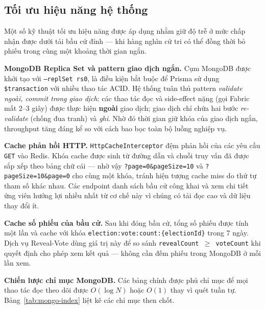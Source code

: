 \subsection{Tối ưu hiệu năng hệ thống}

Một số kỹ thuật tối ưu hiệu năng được áp dụng nhằm giữ độ trễ ở mức chấp nhận được dưới tải bầu cử đỉnh — khi hàng nghìn cử tri có thể đồng thời bỏ phiếu trong cùng một khoảng thời gian ngắn.

\textbf{MongoDB Replica Set và pattern giao dịch ngắn.} Cụm MongoDB được khởi tạo với \texttt{--replSet rs0}, là điều kiện bắt buộc để Prisma sử dụng \texttt{\$transaction} với nhiều thao tác ACID. Hệ thống tuân thủ pattern \textit{validate ngoài, commit trong giao dịch}: các thao tác đọc và side-effect nặng (gọi Fabric mất 2--3 giây) được thực hiện \textbf{ngoài} giao dịch; giao dịch chỉ chứa hai bước \textit{re-validate} (chống đua tranh) và \textit{ghi}. Nhờ đó thời gian giữ khóa của giao dịch ngắn, throughput tăng đáng kể so với cách bao bọc toàn bộ luồng nghiệp vụ.

\textbf{Cache phản hồi HTTP.} \texttt{HttpCacheInterceptor} đệm phản hồi của các yêu cầu \texttt{GET} vào Redis. Khóa cache được sinh từ đường dẫn và chuỗi truy vấn đã được sắp xếp theo bảng chữ cái — nhờ vậy \texttt{?page=0\&pageSize=10} và \texttt{?pageSize=10\&page=0} cho cùng một khóa, tránh hiện tượng cache miss do thứ tự tham số khác nhau. Các endpoint danh sách bầu cử công khai và xem chi tiết ứng viên hưởng lợi nhiều nhất từ cơ chế này vì chúng có tải đọc cao và dữ liệu thay đổi ít.

\textbf{Cache số phiếu của bầu cử.} Sau khi đóng bầu cử, tổng số phiếu được tính một lần và cache với khóa \texttt{election:vote:count:\{electionId\}} trong 7 ngày. Dịch vụ Reveal-Vote dùng giá trị này để so sánh \texttt{revealCount $\geq$ voteCount} khi quyết định cho phép xem kết quả — không cần đếm phiếu trong MongoDB ở mỗi lần xem.

\textbf{Chiến lược chỉ mục MongoDB.} Các bảng chính được phủ chỉ mục để mọi thao tác đọc theo dõi được $O(\log N)$ hoặc $O(1)$ thay vì quét tuần tự. Bảng~\ref{tab:mongo-index} liệt kê các chỉ mục then chốt.

